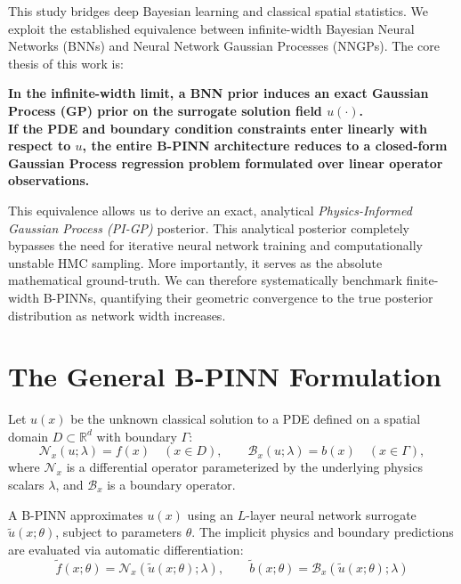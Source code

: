 \documentclass[11pt]{article}
\begin{document}
This study bridges deep Bayesian learning and classical spatial statistics. We exploit the established equivalence between infinite-width Bayesian Neural Networks (BNNs) and Neural Network Gaussian Processes (NNGPs). The core thesis of this work is:
\begin{center}
\textbf{In the infinite-width limit, a BNN prior induces an exact Gaussian Process (GP) prior on the surrogate solution field $u(\cdot)$.} \\
\vspace{0.2cm}
\textbf{If the PDE and boundary condition constraints enter linearly with respect to $u$, the entire B-PINN architecture reduces to a closed-form Gaussian Process regression problem formulated over linear operator observations.}
\end{center}
This equivalence allows us to derive an exact, analytical \emph{Physics-Informed Gaussian Process (PI-GP)} posterior. This analytical posterior completely bypasses the need for iterative neural network training and computationally unstable HMC sampling. More importantly, it serves as the absolute mathematical ground-truth. We can therefore systematically benchmark finite-width B-PINNs, quantifying their geometric convergence to the true posterior distribution as network width increases.

\section{The General B-PINN Formulation}

Let $u(x)$ be the unknown classical solution to a PDE defined on a spatial domain $D \subset \mathbb{R}^d$ with boundary $\Gamma$:
\begin{equation}
\mathcal{N}_x(u;\lambda)=f(x) \quad (x\in D),\qquad \mathcal{B}_x(u;\lambda)=b(x) \quad (x\in \Gamma),
\end{equation}
where $\mathcal{N}_x$ is a differential operator parameterized by the underlying physics scalars $\lambda$, and $\mathcal{B}_x$ is a boundary operator.

A B-PINN approximates $u(x)$ using an $L$-layer neural network surrogate $\tilde u(x;\theta)$, subject to parameters $\theta$. The implicit physics and boundary predictions are evaluated via automatic differentiation:
\begin{equation}
\tilde f(x;\theta)=\mathcal{N}_x(\tilde u(x;\theta);\lambda),\qquad \tilde b(x;\theta)=\mathcal{B}_x(\tilde u(x;\theta);\lambda)
\end{equation}
\end{document}
